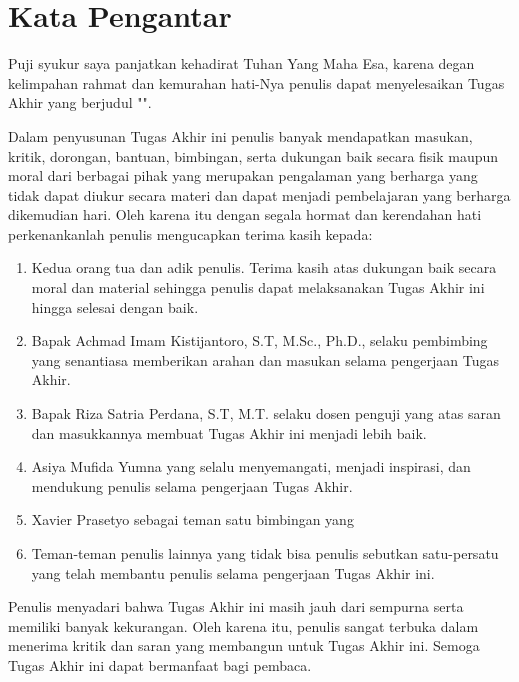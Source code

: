 \chapter*{Kata Pengantar}

Puji syukur saya panjatkan kehadirat Tuhan Yang Maha Esa, karena degan kelimpahan rahmat dan kemurahan hati-Nya penulis dapat menyelesaikan Tugas Akhir yang berjudul "\thetitle".

Dalam penyusunan Tugas Akhir ini penulis banyak mendapatkan masukan, kritik, dorongan, bantuan, bimbingan, serta dukungan baik secara fisik maupun moral dari berbagai pihak yang merupakan pengalaman yang berharga yang tidak dapat diukur secara materi dan dapat menjadi pembelajaran yang berharga dikemudian hari. Oleh karena itu dengan segala hormat dan kerendahan hati perkenankanlah penulis mengucapkan terima kasih kepada:

\begin{enumerate}
	\item Kedua orang tua dan adik penulis. Terima kasih atas dukungan baik secara moral dan material sehingga penulis dapat melaksanakan Tugas Akhir ini hingga selesai dengan baik.
	\item Bapak Achmad Imam Kistijantoro, S.T, M.Sc., Ph.D., selaku pembimbing yang senantiasa memberikan arahan dan masukan selama pengerjaan Tugas Akhir.
	\item Bapak Riza Satria Perdana, S.T, M.T. selaku dosen penguji yang atas saran dan masukkannya membuat Tugas Akhir ini menjadi lebih baik.
	\item Asiya Mufida Yumna yang selalu menyemangati, menjadi inspirasi, dan mendukung penulis selama pengerjaan Tugas Akhir.	
	\item Xavier Prasetyo sebagai teman satu bimbingan yang 
	\item Teman-teman penulis lainnya yang tidak bisa penulis sebutkan satu-persatu yang telah membantu penulis selama pengerjaan Tugas Akhir ini.
\end{enumerate}

Penulis menyadari bahwa Tugas Akhir ini masih jauh dari sempurna serta memiliki banyak kekurangan. Oleh karena itu, penulis sangat terbuka dalam menerima kritik dan saran yang membangun untuk Tugas Akhir ini. Semoga Tugas Akhir ini dapat bermanfaat bagi pembaca.

